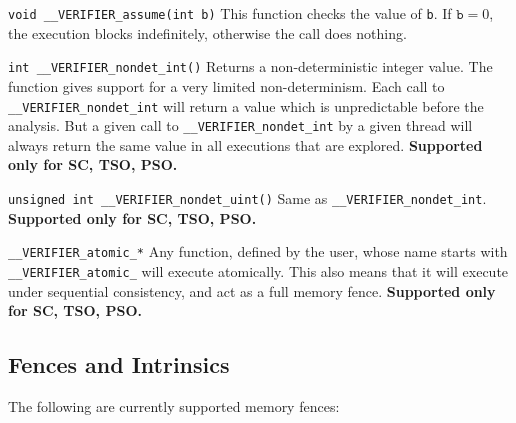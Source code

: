 \documentclass[a4paper]{article}
\newcommand{\limitsupport}[1]{\textbf{Supported only for #1.}}
\begin{document}
\begin{description}
\item{\texttt{void \_\_VERIFIER\_assume(int b)}}
%
  This function checks the value of \texttt{b}. If $\texttt{b} = 0$,
  the execution blocks indefinitely, otherwise the call does nothing.
\item{\texttt{int \_\_VERIFIER\_nondet\_int()}}
%
  Returns a non-deterministic integer value. The function gives
  support for a very limited non-determinism. Each call to
  \texttt{\_\_VERIFIER\_nondet\_int} will return a value which is
  unpredictable before the analysis. But a given call to
  \texttt{\_\_VERIFIER\_nondet\_int} by a given thread will always
  return the same value in all executions that are explored.
%
  \limitsupport{SC, TSO, PSO}
\item{\texttt{unsigned int \_\_VERIFIER\_nondet\_uint()}}
%
  Same as \texttt{\_\_VERIFIER\_nondet\_int}.
%
  \limitsupport{SC, TSO, PSO}
\item{\texttt{\_\_VERIFIER\_atomic\_*}}
%
  Any function, defined by the user, whose name starts with
  \texttt{\_\_VERIFIER\_atomic\_} will execute atomically. This also
  means that it will execute under sequential consistency, and act as
  a full memory fence.
%
  \limitsupport{SC, TSO, PSO}
\end{description}

\subsection{Fences and Intrinsics}

The following are currently supported memory fences:
\end{document}
